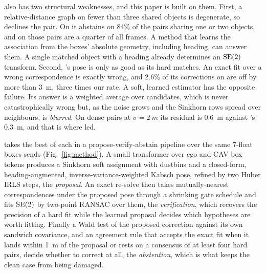 \freealign also has two structural weaknesses, and this paper is built on them. First, a relative-distance graph on fewer than three shared objects is degenerate, so \freealign declines the pair. On \opvv it abstains on 84\% of the pairs sharing one or two objects, and on \vxreal those pairs are a quarter of all frames. A method that learns the association from the boxes' absolute geometry, including heading, can answer them. A single matched object with a heading already determines an $\mathrm{SE}(2)$ transform. Second, \freealign's pose is only as good as its hard matches. An exact fit over a wrong correspondence is exactly wrong, and 2.6\% of its corrections on \opvv are off by more than \SI{3}{m}, three times our rate. A soft, learned estimator has the opposite failure. Its answer is a weighted average over candidates, which is never catastrophically wrong but, as the noise grows and the Sinkhorn rows spread over neighbours, is \emph{blurred}. On dense \vxreal pairs at $\sigma=\SI{2}{m}$ its residual is \SI{0.6}{m} against \freealign's \SI{0.3}{m}, and that is where \freealign led.

\paper takes the best of each in a propose-verify-abstain pipeline over the same 7-float boxes \freealign sends (Fig.~\ref{fig:method}). A small transformer over ego and CAV box tokens produces a Sinkhorn soft assignment with dustbins and a closed-form, heading-augmented, inverse-variance-weighted Kabsch pose, refined by two Huber IRLS steps, the \emph{proposal}. An exact re-solve then takes mutually-nearest correspondences under the proposed pose through a shrinking gate schedule and fits $\mathrm{SE}(2)$ by two-point RANSAC over them, the \emph{verification}, which recovers the precision of a hard fit while the learned proposal decides which hypotheses are worth fitting. Finally a Wald test of the proposed correction against its own sandwich covariance, and an agreement rule that accepts the exact fit when it lands within \SI{1}{m} of the proposal or rests on a consensus of at least four hard pairs, decide whether to correct at all, the \emph{abstention}, which is what keeps the clean case from being damaged.

